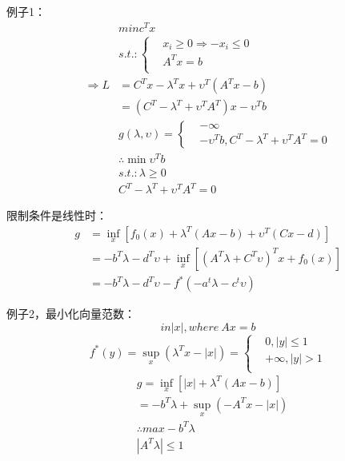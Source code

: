\documentclass[UTF8]{article}
\begin{document}
例子1：
\begin{equation}
\begin{split}
&min c^Tx\\
&s.t.:
\begin{cases}
&x_i\geqslant0 \Rightarrow -x_i\leqslant 0\\
&A^Tx=b\\
\end{cases}\\
\Rightarrow L&=C^Tx-\lambda^Tx+\upsilon ^T(A^Tx-b)\\
&=\left( C^T-\lambda ^T +\upsilon ^TA^T \right)x-\upsilon ^Tb\\
&g(\lambda, \upsilon)= 
    \begin{cases}
      &-\infty \\
      &-\upsilon ^Tb, C^T-\lambda ^T +\upsilon ^TA^T=0
    \end{cases} \\
&\therefore \min \upsilon ^Tb\\
&s.t.:\lambda \geqslant 0\\
&C^T-\lambda ^T +\upsilon ^TA^T=0
\end{split}
\end{equation}
 
限制条件是线性时：
\begin{equation}
    \begin{split}
    g&=\inf_x \left[ f_0(x)+\lambda ^T(Ax-b)+\upsilon ^T(Cx-d) \right]\\
    &=-b^T\lambda-d^T\upsilon +\inf_x \left[ \left( A^T\lambda +C^T\upsilon \right)^Tx+f_0(x) \right]\\
    &= -b^T\lambda-d^T\upsilon-f^*\left( -a^t\lambda-c^t\upsilon \right)
    \end{split}
\end{equation}
 
例子2，最小化向量范数：
\begin{equation}
 in|x|, where \ Ax=b
\end{equation}
\begin{equation}
 f^*(y)=\sup_x \left( \lambda^Tx-|x| \right)=\left\{  
  \begin{aligned}
     &0,|y|\leqslant 1\\
    &+\infty,|y|>1\\
  \end{aligned} \right.
\end{equation}
\begin{equation}
    \begin{split}
    &g=\inf_x \left[ |x|+\lambda^T(Ax-b) \right]\\
    &=-b^T\lambda+\sup_x \left( -A^Tx-|x| \right)\\
    & \therefore max -b^T\lambda\\
    & |A^T\lambda|\leqslant1
    \end{split}
\end{equation}
  
\end{document}

